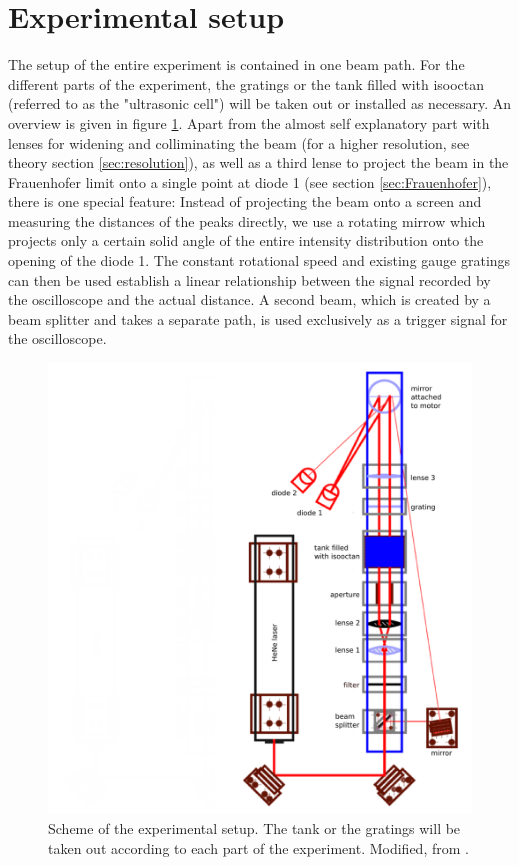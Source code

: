 \section{Experimental setup}
The setup of the entire experiment is contained in one beam path. 
For the different parts of the experiment, the gratings or the tank 
filled with isooctan (referred to as the "ultrasonic cell") will be 
taken out or installed as necessary. An overview is given in figure \ref{fig:setup}.
Apart from the almost self explanatory part with lenses for widening and 
colliminating the beam (for a higher resolution, see theory section \ref{sec:resolution}), 
as well as a third lense to project the beam in the Frauenhofer limit 
onto a single point at diode 1 (see section \ref{sec:Frauenhofer}), 
there is one special feature: Instead of projecting the beam onto a screen and 
measuring the distances of the peaks directly, we use a rotating mirrow which 
projects only a certain solid angle of the entire intensity distribution onto 
the opening of the diode 1. The constant rotational speed and existing gauge gratings 
can then be used establish a linear relationship between the signal recorded by the 
oscilloscope and the actual distance. A second beam, which is created by a beam splitter and 
takes a separate path, is used exclusively as a trigger signal for the oscilloscope.

\begin{figure}
    \centering
    \includegraphics[width=1.0\textwidth]{figures/setup_bitmap.png}
    \caption{
        Scheme of the experimental setup. The tank or the gratings will be taken out 
        according to each part of the experiment.
        Modified, from \cite{ver}.
        }
    \label{fig:setup}
\end{figure}
